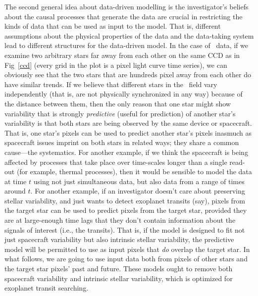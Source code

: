 The second general idea about data-driven modelling is the investigator's beliefs about the causal processes that generate the data are crucial in restricting the kinds of data that can be used as input to the model.
That is, different assumptions about the physical properties of the data and the data-taking system lead to different structures for the data-driven model.
In the case of \Kepler\ data, if we examine two arbitrary stars far away from each other on the same CCD as in Fig~\ref{ccd} (every grid in the plot is a pixel light curve time series), we can obviously see that the two stars that are hundreds pixel away from each other do have similar trends. 
  If we believe that different stars in the \Kepler\ field vary independently 
  (that is, are not physically synchronized in any way) because of the distance between them, 
  then the only reason that one star might show variability that is strongly \emph{predictive} (useful for prediction) of another star's variability
  is that both stars are being observed by the same device or spacecraft.
That is, one star's pixels can be used to predict another star's pixels inasmuch as spacecraft issues imprint on both stars in related ways;
  they share a common cause---the systematics.  
For another example, if we think the spacecraft is being affected by
  processes that take place over time-scales longer than a single read-out
  (for example, thermal processes),
  then it would be sensible to model the data at time $t$ using not just simultaneous data, but also data from a range of times around $t$.
For another example, if an investigator doesn't care about preserving stellar variability,
  and just wants to detect exoplanet transits (say),
  pixels from the target star can be used to predict pixels from the target star,
  provided they are at large-enough time lags that they don't contain information about
  the signals of interest (i.e., the transits).
That is, if the model is designed to fit not just spacecraft variability
  but also intrinsic stellar variability,
  the predictive model will be permitted to use as input pixels that \emph{do} overlap the target star.
In what follows, we are going to use input data both from pixels of other stars and the target star pixels' past and future.
These models ought to remove both spacecraft variability and intrinsic stellar variability, which is optimized for exoplanet transit searching.

